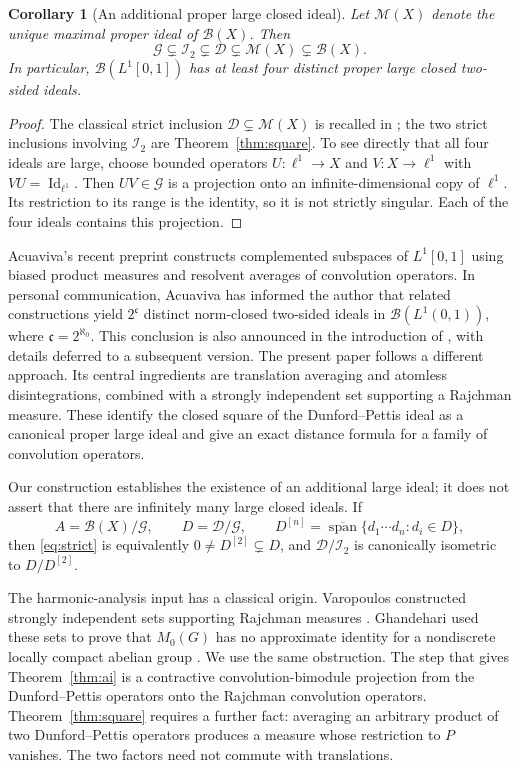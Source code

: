 \documentclass[11pt,reqno]{amsart}
\newtheorem{corollary}[theorem]{Corollary}
\theoremstyle{definition}
\theoremstyle{remark}
\newcommand{\B}{\mathcal B}
\newcommand{\D}{\mathcal D}
\newcommand{\G}{\mathcal G}
\newcommand{\I}{\mathcal I}
\newcommand{\Id}{\operatorname{Id}}
\newcommand{\clspan}{\overline{\operatorname{span}}}
\begin{document}
\begin{corollary}[An additional proper large closed ideal]\label{cor:large}
Let $\mathcal M(X)$ denote the unique maximal proper ideal of $\B(X)$. Then
\[
 \G\subsetneq\I_2\subsetneq\D\subsetneq\mathcal M(X)\subsetneq\B(X).
\]
In particular, $\B(L^1[0,1])$ has at least four distinct proper large closed two-sided ideals.
\end{corollary}
\begin{proof}
The classical strict inclusion $\D\subsetneq\mathcal M(X)$ is recalled in \cite[Introduction]{JPS}; the two strict inclusions involving $\I_2$ are Theorem~\ref{thm:square}. To see directly that all four ideals are large, choose bounded operators $U:\ell^1\to X$ and $V:X\to\ell^1$ with $VU=\Id_{\ell^1}$. Then $UV\in\G$ is a projection onto an infinite-dimensional copy of $\ell^1$. Its restriction to its range is the identity, so it is not strictly singular. Each of the four ideals contains this projection.
\end{proof}

Acuaviva's recent preprint \cite{Acuaviva} constructs complemented subspaces of $L^1[0,1]$ using biased product measures and resolvent averages of convolution operators. In personal communication, Acuaviva has informed the author that related constructions yield $2^{\mathfrak c}$ distinct norm-closed two-sided ideals in $\B(L^1(0,1))$, where $\mathfrak c=2^{\aleph_0}$. This conclusion is also announced in the introduction of \cite{Acuaviva}, with details deferred to a subsequent version. The present paper follows a different approach. Its central ingredients are translation averaging and atomless disintegrations, combined with a strongly independent set supporting a Rajchman measure. These identify the closed square of the Dunford--Pettis ideal as a canonical proper large ideal and give an exact distance formula for a family of convolution operators.

Our construction establishes the existence of an additional large ideal; it does not assert that there are infinitely many large closed ideals. If
\[
 A=\B(X)/\G,\qquad D=\D/\G,\qquad
 D^{[n]}=\clspan\{d_1\cdots d_n:d_i\in D\},
\]
then \eqref{eq:strict} is equivalently $0\ne D^{[2]}\subsetneq D$, and $\D/\I_2$ is canonically isometric to $D/D^{[2]}$.

The harmonic-analysis input has a classical origin. Varopoulos constructed strongly independent sets supporting Rajchman measures \cite{VarSets,VarDecomp}. Ghandehari used these sets to prove that $M_0(G)$ has no approximate identity for a nondiscrete locally compact abelian group \cite[Theorem~3.3]{Gh12}. We use the same obstruction. The step that gives Theorem~\ref{thm:ai} is a contractive convolution-bimodule projection from the Dunford--Pettis operators onto the Rajchman convolution operators. Theorem~\ref{thm:square} requires a further fact: averaging an arbitrary product of two Dunford--Pettis operators produces a measure whose restriction to $P$ vanishes. The two factors need not commute with translations.
\end{document}
